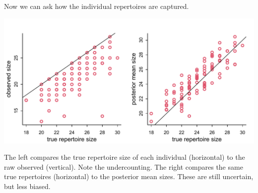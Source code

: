 \documentclass[reqno ,11pt]{amsart}
\begin{document}
Now we can ask how the individual repertoires are captured.
\begin{center}
	\includegraphics[scale=0.6]{fig_repertoires.pdf}
\end{center}
The left compares the true repertoire size of each individual (horizontal) to the raw observed (vertical). Note the undercounting. The right compares the same true repertoires (horizontal) to the posterior mean sizes. These are still uncertain, but less biased.

\clearpage
 

\end{document}
